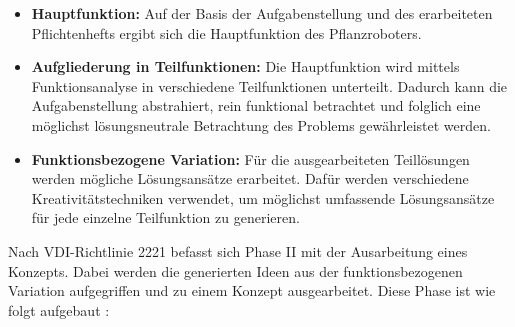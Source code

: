 \begin{itemize}
	\item \textbf{Hauptfunktion:} Auf der Basis der Aufgabenstellung und des erarbeiteten Pflichtenhefts ergibt sich die Hauptfunktion des Pflanzroboters.
	
	\item \textbf{Aufgliederung in Teilfunktionen:} Die Hauptfunktion wird mittels Funktionsanalyse in verschiedene Teilfunktionen unterteilt. Dadurch kann die Aufgabenstellung abstrahiert, rein funktional betrachtet und folglich eine möglichst lösungsneutrale Betrachtung des Problems gewährleistet werden.
	
	\item \textbf{Funktionsbezogene Variation:} Für die ausgearbeiteten Teillösungen werden mögliche Lösungsansätze erarbeitet. Dafür werden verschiedene Kreativitätstechniken verwendet, um möglichst umfassende Lösungsansätze für jede einzelne Teilfunktion zu generieren.

\end{itemize}

Nach  VDI-Richtlinie 2221 befasst sich Phase II mit der Ausarbeitung eines Konzepts. Dabei werden die generierten Ideen aus der funktionsbezogenen Variation aufgegriffen und zu einem Konzept ausgearbeitet. Diese Phase ist wie folgt aufgebaut \cite{vdi2221}:

